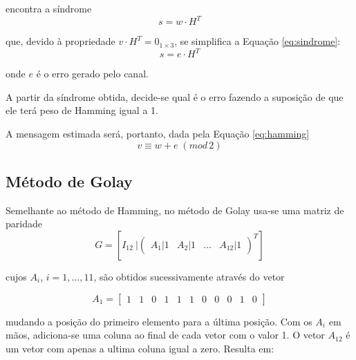 \documentclass[%
aip,
jmp,%
amsmath,amssymb,
reprint,%
]{revtex4-1}
\begin{document}
	encontra a síndrome	
	\begin{equation}
		s = w\cdot H^{T}
	\end{equation}
	
	que, devido à propriedade $v\cdot H^{T}=0_{1\times3}$, se simplifica a Equação \ref{eq:sindrome}:	
	\begin{equation}
		s = e\cdot H^{T} \label{eq:sindrome}
	\end{equation}
	
	onde $e$ é o erro gerado pelo canal.
	
	A partir da síndrome obtida, decide-se qual é o erro fazendo a suposição de que ele terá peso de Hamming igual a 1.
	
	A mensagem estimada será, portanto, dada pela Equação \ref{eq:hamming}	
	\begin{equation}
		v \equiv w+e\; (mod\, 2) \label{eq:hamming}
	\end{equation}
	
	\subsection{Método de Golay}
	
	Semelhante ao método de Hamming, no método de Golay usa-se uma matriz de paridade
	\begin{equation}
	G = \left[I_{12}\:|\left(\begin{array}{cccc}
	A_1|1&A_2|1&...&A_{12}|1
	\end{array}\right)^{T}\right]
	\end{equation}
	
	cujos $A_{i}$, $i=1,...,11$, são obtidos sucessivamente através do vetor
	
	\begin{equation}
		A_1 = \left[\begin{array}{ccccccccccc}
		1&1&0&1&1&1&0&0&0&1&0
		\end{array}\right]
	\end{equation}
	
	mudando a posição do primeiro elemento para a última posição. Com os $A_i$ em mãos, adiciona-se uma coluna ao final de cada vetor com o valor 1. O vetor $A_{12}$ é um vetor com apenas a ultima coluna igual a zero. Resulta em:
	
\end{document}
